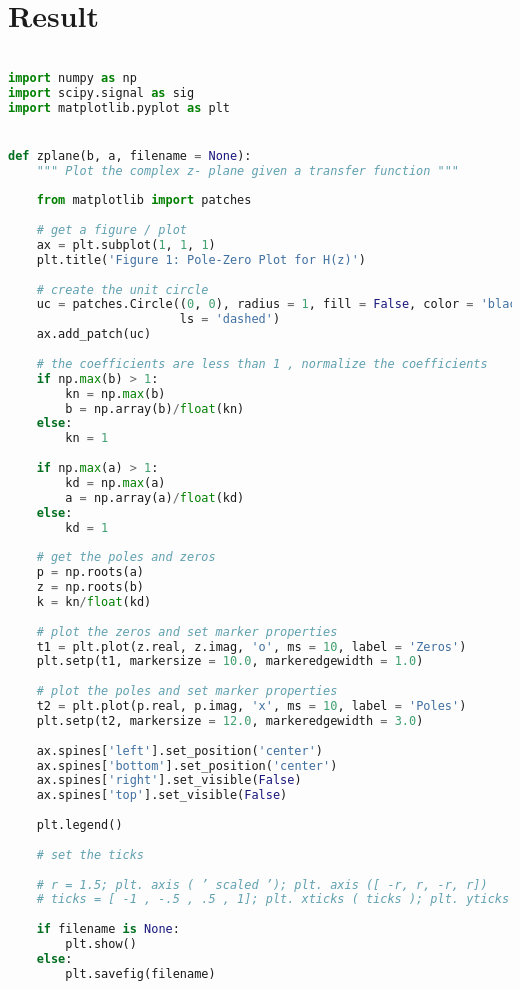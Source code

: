 \documentclass[12pt]{report}
\begin{document}
\section{Result}
\begin{lstlisting}[language=Python]

import numpy as np
import scipy.signal as sig
import matplotlib.pyplot as plt


def zplane(b, a, filename = None):
    """ Plot the complex z- plane given a transfer function """
    
    from matplotlib import patches
    
    # get a figure / plot
    ax = plt.subplot(1, 1, 1)
    plt.title('Figure 1: Pole-Zero Plot for H(z)')
    
    # create the unit circle
    uc = patches.Circle((0, 0), radius = 1, fill = False, color = 'black', 
                        ls = 'dashed')
    ax.add_patch(uc)
    
    # the coefficients are less than 1 , normalize the coefficients
    if np.max(b) > 1:
        kn = np.max(b)
        b = np.array(b)/float(kn)
    else:
        kn = 1
    
    if np.max(a) > 1:
        kd = np.max(a)
        a = np.array(a)/float(kd)
    else:
        kd = 1
    
    # get the poles and zeros
    p = np.roots(a)
    z = np.roots(b)
    k = kn/float(kd)
    
    # plot the zeros and set marker properties
    t1 = plt.plot(z.real, z.imag, 'o', ms = 10, label = 'Zeros')
    plt.setp(t1, markersize = 10.0, markeredgewidth = 1.0)
    
    # plot the poles and set marker properties
    t2 = plt.plot(p.real, p.imag, 'x', ms = 10, label = 'Poles')
    plt.setp(t2, markersize = 12.0, markeredgewidth = 3.0)
    
    ax.spines['left'].set_position('center')
    ax.spines['bottom'].set_position('center')
    ax.spines['right'].set_visible(False)
    ax.spines['top'].set_visible(False)
    
    plt.legend()
    
    # set the ticks
    
    # r = 1.5; plt. axis ( ’ scaled ’); plt. axis ([ -r, r, -r, r])
    # ticks = [ -1 , -.5 , .5 , 1]; plt. xticks ( ticks ); plt. yticks ( ticks )
    
    if filename is None:
        plt.show()
    else:
        plt.savefig(filename)
    

\end{lstlisting}
\end{document}
